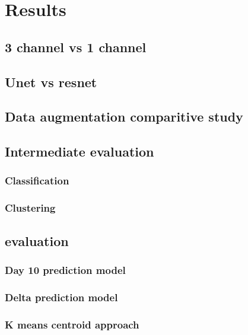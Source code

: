 \chapter{Results} \label{chapter:experimentsresults} 

\section{3 channel vs 1 channel}
\section{Unet vs resnet}

\section{Data augmentation comparitive study}

\section{Intermediate evaluation}
\subsection{Classification} \label{subsection:classification}

\subsection{Clustering} \label{subsection:kmeans}


\section{evaluation}

\subsection{Day 10 prediction model} \label{subection:day10prediction}
\subsection{Delta prediction model} \label{subsection:deltaprediction}
\subsection{K means centroid approach} \label{subsection:kmeanscentroid}





